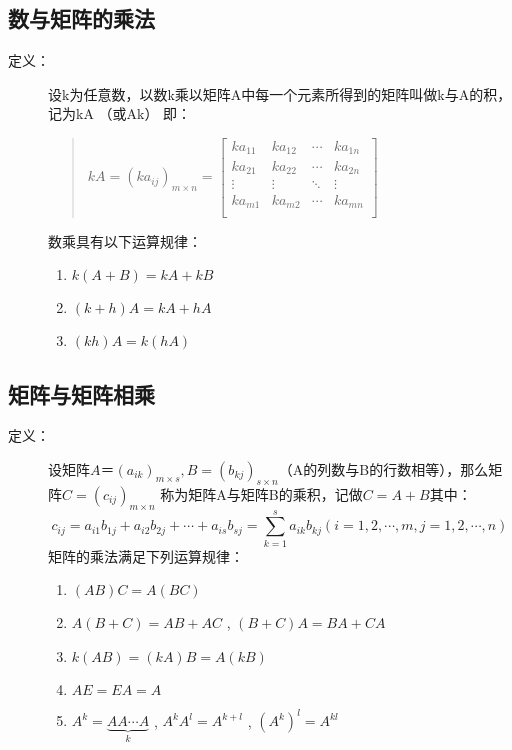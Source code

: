 \documentclass[a4paper,10pt]{article}
\begin{document}
\begin{CJK}{UTF8}{song}
\subsection{数与矩阵的乘法}
\begin{description}
\item[定义：]设k为任意数，以数k乘以矩阵A中每一个元素所得到的矩阵叫做k与A的积，记为kA （或Ak） 即：
\begin{quote}
$kA=(ka_{ij})_{m\times{}n}=
\left[\begin{array}{cccc}
ka_{11}&ka_{12}&\cdots{}&ka_{1n} \\
ka_{21}&ka_{22}&\cdots{}&ka_{2n} \\
\vdots&\vdots&\ddots{}&\vdots \\
ka_{m1}&ka_{m2}&\cdots{}&ka_{mn} \\          
\end{array}\right]  
$ 
\end{quote}
数乘具有以下运算规律：
\begin{enumerate}
\item $k(A+B)=kA+kB$
\item $(k+h)A=kA+hA$
\item $(kh)A=k(hA)$
\end{enumerate}
\end{description}
\subsection{矩阵与矩阵相乘}
\begin{description}
 \item[定义：]设矩阵$A＝(a_{ik})_{m\times{}s},B=(b_{kj})_{s\times{}n}$（A的列数与B的行数相等），那么矩阵$C=(c_{ij})_{m\times{}n}$ 称为矩阵A与矩阵B的乘积，记做$C=A+B$其中：
\begin{displaymath}
c_{ij}=a_{i1}b_{1j}+a_{i2}b_{2j}+\cdots{}+a_{is}b_{sj}
=\sum_{k=1}^{s}a_{ik}b_{kj}(i=1,2,\cdots{},m,j=1,2,\cdots{},n)
\end{displaymath}
矩阵的乘法满足下列运算规律：
\begin{enumerate}
\item $(AB)C=A(BC)$
\item $A(B+C)=AB+AC$ , $(B+C)A=BA+CA$
\item $k(AB)=(kA)B=A(kB)$
\item $AE=EA=A$
\item $A^{k}=\underbrace{AA\cdots{}A}_{k}$ , $A^{k}A^{l}=A^{k+l}$ , $(A^{k})^{l}=A^{kl}$
\end{enumerate}
\end{description}

\end{CJK}
\end{document}
